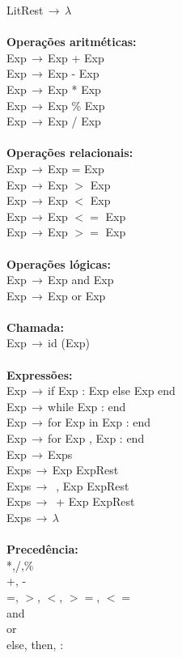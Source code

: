 \documentclass[letterpaper,12pt]{article}
\begin{document}
LitRest$\,\to\,$$\lambda$\\
\\
\textbf{Opera\c{c}\~oes aritm\'eticas:}\\
Exp$\,\to\,$Exp + Exp\\
Exp$\,\to\,$Exp - Exp\\
Exp$\,\to\,$Exp * Exp\\
Exp$\,\to\,$Exp \% Exp\\
Exp$\,\to\,$Exp / Exp\\
\\
\textbf{Opera\c{c}\~oes relacionais:}\\
Exp$\,\to\,$Exp = Exp\\
Exp$\,\to\,$Exp $>$ Exp\\
Exp$\,\to\,$Exp $<$ Exp\\
Exp$\,\to\,$Exp $<=$ Exp\\
Exp$\,\to\,$Exp $>=$ Exp\\
\\
\textbf{Opera\c{c}\~oes l\'ogicas:}\\
Exp$\,\to\,$Exp and Exp\\
Exp$\,\to\,$Exp or Exp\\
\\
\textbf{Chamada:}\\
Exp$\,\to\,$id (Exp)\\
\\
\textbf{Express\~oes:}\\
Exp$\,\to\,$if Exp : Exp else Exp end\\
Exp$\,\to\,$while Exp : end\\
Exp$\,\to\,$for Exp in Exp : end\\
Exp$\,\to\,$for Exp , Exp : end\\
Exp$\,\to\,$Exps \\
Exps$\,\to\,$Exp ExpRest\\
Exps$\,\to\,$ , Exp ExpRest\\
Exps$\,\to\,$ + Exp ExpRest\\ 
Exps$\,\to\,$$\lambda$\\
\\
\textbf{Preced\^encia:}\\
*,/,\% \\
+, -\\
=, $>$, $<$, $>=$, $<=$ \\
and\\
or\\
else, then, :\\
\end{document}
